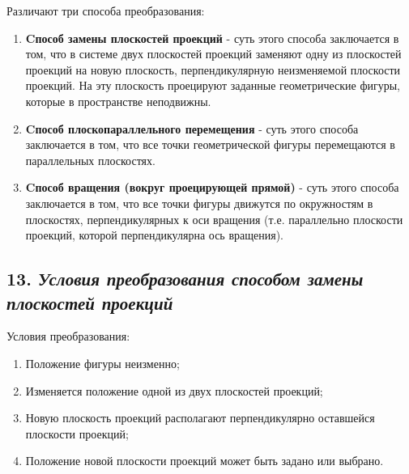 Различают три способа преобразования:
\begin {enumerate}

\item {\bf Cпособ замены плоскостей проекций} - суть этого способа заключается в том, что в системе двух плоскостей проекций заменяют одну из плоскостей проекций на новую плоскость, перпендикулярную
неизменяемой плоскости проекций. На эту плоскость проецируют заданные
геометрические фигуры, которые в пространстве неподвижны.


\item {\bf Cпособ плоскопараллельного перемещения} - суть этого способа заключается в том, что все точки геометрической фигуры перемещаются в
параллельных плоскостях.


\item {\bf Cпособ вращения (вокруг проецирующей прямой)} - суть этого способа заключается в том, что все точки фигуры движутся по окружностям в плоскостях, перпендикулярных к оси вращения (т.е. параллельно плоскости проекций, которой перпендикулярна ось вращения).


\end {enumerate}




\newpage
\subsection*{13. \textit{Условия преобразования способом замены плоскостей проекций}}

\begin{mainQuote}
    
\end{mainQuote}

Условия преобразования:
\begin{enumerate}
    \item Положение фигуры неизменно;
    \item Изменяется положение одной из двух плоскостей проекций;
    \item Новую плоскость проекций располагают перпендикулярно оставшейся плоскости проекций;
    \item Положение новой плоскости проекций может быть задано или выбрано.
\end{enumerate}

